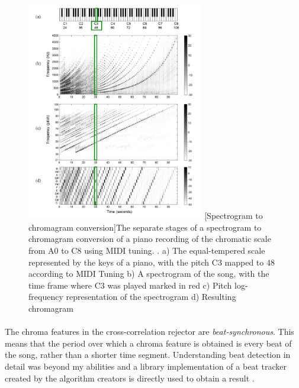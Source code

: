 \begin{figure}[H]
    \centering
    \includegraphics[width=0.69\textwidth]{Algorithms/spectrogram_to_chromagram.png}
    [Spectrogram to chromagram conversion]{The separate stages of a spectrogram to chromagram conversion of a piano recording of the chromatic scale from A0 to C8 using MIDI tuning. \cite{mullershort}. a) The equal-tempered scale represented by the keys of a piano, with the pitch C3 mapped to 48 according to MIDI Tuning b) A spectrogram of the song, with the time frame where C3 was played marked in red c) Pitch log-frequency representation of the spectrogram d) Resulting chromagram}
    \label{fig:spectrotochroma}
\end{figure}

\paragraph{}
The chroma features in the cross-correlation rejector are
\textit{beat-synchronous}. This means that the period over which a chroma
feature is obtained is every beat of the song, rather than a shorter time
segment. Understanding beat detection in detail was beyond my abilities and a
library implementation of a beat tracker created by the algorithm creators is
directly used to obtain a result \cite{librosa_beat}.

